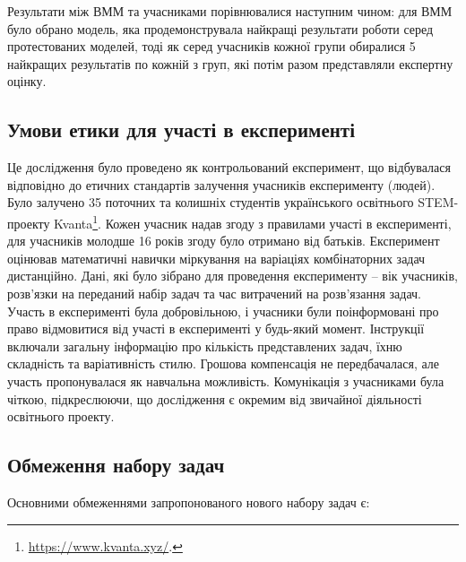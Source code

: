 Результати між ВММ та учасниками порівнювалися наступним чином: для ВММ було обрано модель, яка продемонструвала найкращі результати роботи серед протестованих моделей, тоді як серед учасників кожної групи обиралися 5 найкращих результатів по кожній з груп, які потім разом представляли експертну оцінку.

\subsection{Умови етики для участі в експерименті}

Це дослідження було проведено як контрольований експеримент, що відбувалася відповідно до етичних стандартів залучення учасників експерименту (людей). Було залучено 35 поточних та колишніх студентів українського освітнього STEM-проекту Kvanta\footnote{\url{https://www.kvanta.xyz/}.}. Кожен учасник надав згоду з правилами участі в експерименті, для учасників молодше 16 років згоду було отримано від батьків. Експеримент оцінював математичні навички міркування на варіаціях комбінаторних задач дистанційно. Дані, які було зібрано для проведення експерименту -- вік учасників, розв'язки на переданий набір задач та час витрачений на розв'язання задач. Участь в експерименті була добровільною, і учасники були поінформовані про право відмовитися від участі в експерименті у будь-який момент. Інструкції включали загальну інформацію про кількість представлених задач, їхню складність та варіативність стилю. Грошова компенсація не передбачалася, але участь пропонувалася як навчальна можливість. Комунікація з учасниками була чіткою, підкреслюючи, що дослідження є окремим від звичайної діяльності освітнього проекту.

\subsection{Обмеження набору задач}

Основними обмеженнями запропонованого нового набору задач є:

